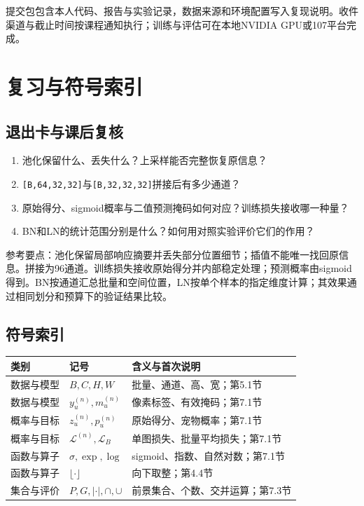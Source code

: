 \documentclass[UTF8,a4paper,11pt,fontset=fandol]{ctexart}
\newcommand{\shape}[1]{\texttt{#1}}
\begin{document}
提交包包含本人代码、报告与实验记录，数据来源和环境配置写入复现说明。收件渠道与截止时间按课程通知执行；训练与评估可在本地NVIDIA GPU或107平台完成。
\clearpage

\section{复习与符号索引}
\subsection{退出卡与课后复核}
\begin{enumerate}
\item 池化保留什么、丢失什么？上采样能否完整恢复原信息？
\item \shape{[B,64,32,32]}与\shape{[B,32,32,32]}拼接后有多少通道？
\item 原始得分、sigmoid概率与二值预测掩码如何对应？训练损失接收哪一种量？
\item BN和LN的统计范围分别是什么？如何用对照实验评价它们的作用？
\end{enumerate}
参考要点：池化保留局部响应摘要并丢失部分位置细节；插值不能唯一找回原信息。拼接为96通道。训练损失接收原始得分并内部稳定处理；预测概率由sigmoid得到。BN按通道汇总批量和空间位置，LN按单个样本的指定维度计算；其效果通过相同划分和预算下的验证结果比较。
\subsection{符号索引}
\par\noindent\begin{tabularx}{\linewidth}{L{2.1cm}L{4.5cm}Y}\toprule
类别 & 记号 & 含义与首次说明\\\midrule
数据与模型 & $B,C,H,W$ & 批量、通道、高、宽；第5.1节\\
数据与模型 & $y_u^{(n)},m_u^{(n)}$ & 像素标签、有效掩码；第7.1节\\
概率与目标 & $z_u^{(n)},p_u^{(n)}$ & 原始得分、宠物概率；第7.1节\\
概率与目标 & $\mathcal L^{(n)},\mathcal L_B$ & 单图损失、批量平均损失；第7.1节\\
函数与算子 & $\sigma,\exp,\log$ & sigmoid、指数、自然对数；第7.1节\\
函数与算子 & $\lfloor\cdot\rfloor$ & 向下取整；第4.4节\\
集合与评价 & $P,G,|\cdot|,\cap,\cup$ & 前景集合、个数、交并运算；第7.3节\\\bottomrule
\end{tabularx}\par
\clearpage
\end{document}
